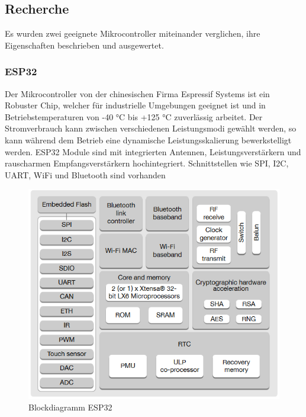\subsection{Recherche}\label{subsec: Recherche}
Es wurden zwei geeignete Mikrocontroller miteinander verglichen, ihre Eigenschaften beschrieben und ausgewertet. 

\subsubsection{ESP32}
Der Mikrocontroller von der chinesischen Firma Espressif Systems ist ein Robuster Chip, welcher für industrielle Umgebungen geeignet ist und in Betriebstemperaturen von -40 °C bis +125 °C zuverlässig arbeitet. Der Stromverbrauch kann zwischen verschiedenen Leistungsmodi gewählt werden, so kann während dem Betrieb eine dynamische Leistungsskalierung bewerkstelligt werden. ESP32 Module sind mit integrierten Antennen, Leistungsverstärkern und rauscharmen Empfangsverstärkern hochintegriert. Schnittstellen wie SPI, I2C, UART, WiFi und Bluetooth sind vorhanden

\begin{figure}[H]
	\centering
	\includegraphics[width=\textwidth]{graphics/blockdiagrammESP32.PNG}
	\caption{Blockdiagramm ESP32 \cite{espressif_esp32-wroom-32_datasheet_en_2019}}
	
	\label{pic: blockdiagrammESP32}
\end{figure} 

